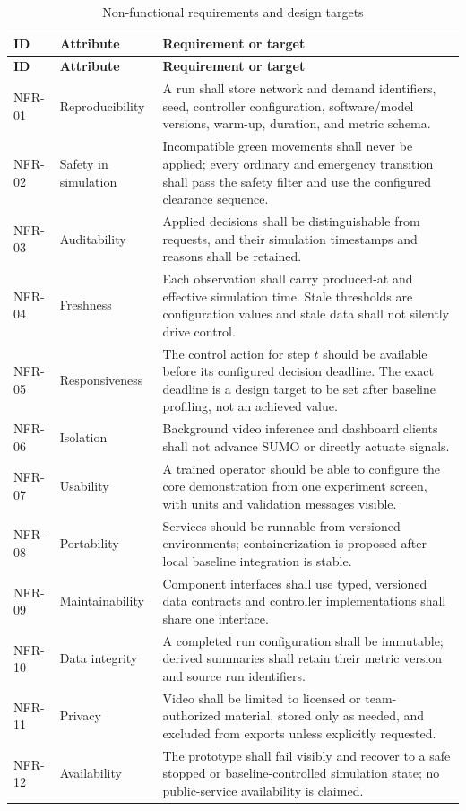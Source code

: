 \begin{longtable}{p{}p{}p{}}
\caption{Non-functional requirements and design targets}\label{tab:nfr}\\
\toprule
\textbf{ID} & \textbf{Attribute} & \textbf{Requirement or target}\\
\midrule\endfirsthead
\toprule
\textbf{ID} & \textbf{Attribute} & \textbf{Requirement or target}\\
\midrule\endhead
NFR-01 & Reproducibility & A run shall store network and demand identifiers, seed, controller configuration, software/model versions, warm-up, duration, and metric schema.\\
NFR-02 & Safety in simulation & Incompatible green movements shall never be applied; every ordinary and emergency transition shall pass the safety filter and use the configured clearance sequence.\\
NFR-03 & Auditability & Applied decisions shall be distinguishable from requests, and their simulation timestamps and reasons shall be retained.\\
NFR-04 & Freshness & Each observation shall carry produced-at and effective simulation time. Stale thresholds are configuration values and stale data shall not silently drive control.\\
NFR-05 & Responsiveness & The control action for step $t$ should be available before its configured decision deadline. The exact deadline is a design target to be set after baseline profiling, not an achieved value.\\
NFR-06 & Isolation & Background video inference and dashboard clients shall not advance SUMO or directly actuate signals.\\
NFR-07 & Usability & A trained operator should be able to configure the core demonstration from one experiment screen, with units and validation messages visible.\\
NFR-08 & Portability & Services should be runnable from versioned environments; containerization is proposed after local baseline integration is stable.\\
NFR-09 & Maintainability & Component interfaces shall use typed, versioned data contracts and controller implementations shall share one interface.\\
NFR-10 & Data integrity & A completed run configuration shall be immutable; derived summaries shall retain their metric version and source run identifiers.\\
NFR-11 & Privacy & Video shall be limited to licensed or team-authorized material, stored only as needed, and excluded from exports unless explicitly requested.\\
NFR-12 & Availability & The prototype shall fail visibly and recover to a safe stopped or baseline-controlled simulation state; no public-service availability is claimed.\\
\bottomrule
\end{longtable}

